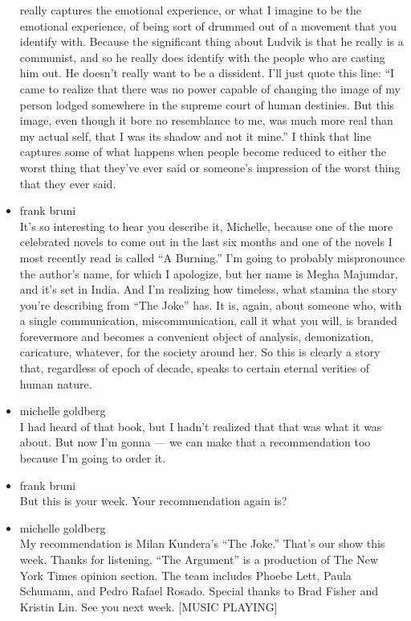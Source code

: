 \begin{itemize}
  really captures the emotional experience, or what I imagine to be the
  emotional experience, of being sort of drummed out of a movement that
  you identify with. Because the significant thing about Ludvik is that
  he really is a communist, and so he really does identify with the
  people who are casting him out. He doesn't really want to be a
  dissident. I'll just quote this line: ``I came to realize that there
  was no power capable of changing the image of my person lodged
  somewhere in the supreme court of human destinies. But this image,
  even though it bore no resemblance to me, was much more real than my
  actual self, that I was its shadow and not it mine.'' I think that
  line captures some of what happens when people become reduced to
  either the worst thing that they've ever said or someone's impression
  of the worst thing that they ever said.
\item
  frank bruni\\
  It's so interesting to hear you describe it, Michelle, because one of
  the more celebrated novels to come out in the last six months and one
  of the novels I most recently read is called ``A Burning.'' I'm going
  to probably mispronounce the author's name, for which I apologize, but
  her name is Megha Majumdar, and it's set in India. And I'm realizing
  how timeless, what stamina the story you're describing from ``The
  Joke'' has. It is, again, about someone who, with a single
  communication, miscommunication, call it what you will, is branded
  forevermore and becomes a convenient object of analysis, demonization,
  caricature, whatever, for the society around her. So this is clearly a
  story that, regardless of epoch of decade, speaks to certain eternal
  verities of human nature.
\item
  michelle goldberg\\
  I had heard of that book, but I hadn't realized that that was what it
  was about. But now I'm gonna --- we can make that a recommendation too
  because I'm going to order it.
\item
  frank bruni\\
  But this is your week. Your recommendation again is?
\item
  michelle goldberg\\
  My recommendation is Milan Kundera's ``The Joke.'' That's our show
  this week. Thanks for listening. ``The Argument'' is a production of
  The New York Times opinion section. The team includes Phoebe Lett,
  Paula Schumann, and Pedro Rafael Rosado. Special thanks to Brad Fisher
  and Kristin Lin. See you next week. {[}MUSIC PLAYING{]}
\end{itemize}

